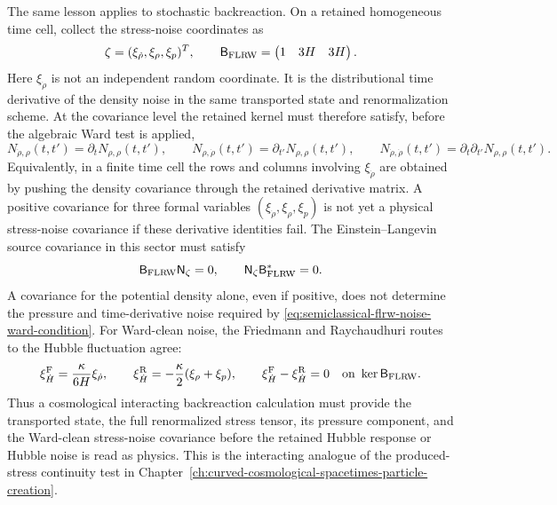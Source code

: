 \begin{controlledapproximation}
The same lesson applies to stochastic backreaction.  On a retained homogeneous
time cell, collect the stress-noise coordinates as
\[
  \zeta
  =
  (\xi_{\dot\rho},\xi_\rho,\xi_p)^T,
  \qquad
  \mathsf B_{\rm FLRW}
  =
  \begin{pmatrix}
    1&3H&3H
  \end{pmatrix}.
\]
Here \(\xi_{\dot\rho}\) is not an independent random coordinate.  It is the
distributional time derivative of the density noise in the same transported
state and renormalization scheme.  At the covariance level the retained kernel
must therefore satisfy, before the algebraic Ward test is applied,
\begin{equation}
  N_{\dot\rho,\rho}(t,t')
  =
  \partial_t N_{\rho,\rho}(t,t'),
  \qquad
  N_{\rho,\dot\rho}(t,t')
  =
  \partial_{t'} N_{\rho,\rho}(t,t'),
  \qquad
  N_{\dot\rho,\dot\rho}(t,t')
  =
  \partial_t\partial_{t'}N_{\rho,\rho}(t,t').
  \label{eq:semiclassical-flrw-derivative-noise-consistency}
\end{equation}
Equivalently, in a finite time cell the rows and columns involving
\(\xi_{\dot\rho}\) are obtained by pushing the density covariance through the
retained derivative matrix.  A positive covariance for three formal variables
\((\xi_{\dot\rho},\xi_\rho,\xi_p)\) is not yet a physical stress-noise
covariance if these derivative identities fail.
The Einstein--Langevin source covariance in this sector must satisfy
\begin{equation}
  \mathsf B_{\rm FLRW}\mathsf N_\zeta=0,
  \qquad
  \mathsf N_\zeta\mathsf B_{\rm FLRW}^*=0 .
  \label{eq:semiclassical-flrw-noise-ward-condition}
\end{equation}
A covariance for the potential density alone, even if positive, does not
determine the pressure and time-derivative noise required by
\eqref{eq:semiclassical-flrw-noise-ward-condition}.  For Ward-clean noise, the
Friedmann and Raychaudhuri routes to the Hubble fluctuation agree:
\begin{equation}
  \xi_{\dot H}^{\rm F}
  =
  \frac{\kappa}{6H}\xi_{\dot\rho},
  \qquad
  \xi_{\dot H}^{\rm R}
  =
  -\frac{\kappa}{2}(\xi_\rho+\xi_p),
  \qquad
  \xi_{\dot H}^{\rm F}-\xi_{\dot H}^{\rm R}=0
  \quad\text{on }\ker\mathsf B_{\rm FLRW}.
  \label{eq:semiclassical-flrw-hubble-noise-closure}
\end{equation}
Thus a cosmological interacting backreaction calculation must provide the
transported state, the full renormalized stress tensor, its pressure component,
and the Ward-clean stress-noise covariance before the retained Hubble response
or Hubble noise is read as physics.  This is the interacting analogue of the
produced-stress continuity test in
Chapter~\ref{ch:curved-cosmological-spacetimes-particle-creation}.
\end{controlledapproximation}

